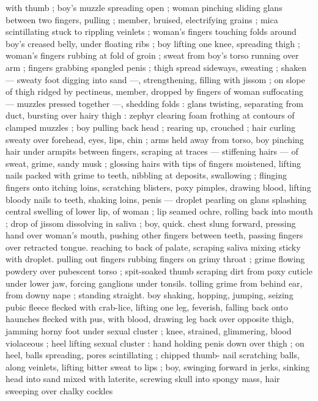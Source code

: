 with thumb ; boy's muzzle spreading open ; woman pinching sliding 
glans between two fingers, pulling ; member, bruised, electrifying 
grains ; mica scintillating stuck to rippling veinlets ; woman's fingers 
touching folds around boy's creased belly, under floating ribs ; boy 
lifting one knee, spreading thigh ; woman's fingers rubbing at fold of 
groin ; sweat from boy's torso running over arm ; fingers grabbing 
spangled penis ; thigh spread sideways, sweating ; shaken --- sweaty 
foot digging into sand ---, strengthening, filling with jissom ; on 
slope of thigh ridged by pectineus, member, dropped by fingers of 
woman suffocating --- muzzles pressed together ---, shedding folds 
: glans twisting, separating from duct, bursting over hairy thigh : 
zephyr clearing foam frothing at contours of clamped muzzles ; boy 
pulling back head ; rearing up, crouched ; hair curling sweaty over 
forehead, eyes, lips, chin ; arms held away from torso, boy pinching 
hair under armpits between fingers, scraping at traces --- stiffening 
hairs --- of sweat, grime, sandy musk ; glossing hairs with tips of 
fingers moistened, lifting nails packed with grime to teeth, nibbling 
at deposits, swallowing ; flinging fingers onto itching loins, 
scratching blisters, poxy pimples, drawing blood, lifting bloody nails 
to teeth, shaking loins, penis --- droplet pearling on glans splashing 
central swelling of lower lip, of woman ; lip seamed ochre, rolling 
back into mouth ; drop of jissom dissolving in saliva ; boy, quick. 
chest slung forward, pressing hand over woman's mouth, pushing 
other fingers between teeth, passing fingers over retracted tongue. 
reaching to back of palate, scraping saliva mixing sticky with droplet. 
pulling out fingers rubbing fingers on grimy throat ; grime flowing 
powdery over pubescent torso ; spit-soaked thumb scraping dirt 
from poxy cuticle under lower jaw, forcing ganglions under tonsils. 
tolling grime from behind ear, from downy nape ; standing straight. 
boy shaking, hopping, jumping, seizing pubic fleece flecked with 
crab-lice, lifting one leg, feverish, falling back onto haunches flecked 
with pus, with blood, drawing leg back over opposite thigh, jamming 
horny foot under sexual cluster ; knee, strained, glimmering, blood 
violaceous ; heel lifting sexual cluster : hand holding penis down over 
thigh ; on heel, balls spreading, pores scintillating ; chipped thumb- 
nail scratching balls, along veinlets, lifting bitter sweat to lips ; boy, 
swinging forward in jerks, sinking head into sand mixed with laterite, 
screwing skull into spongy mass, hair sweeping over chalky cockles 
